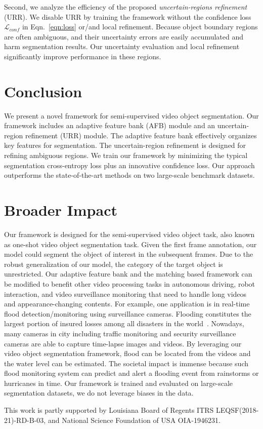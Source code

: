 \documentclass{article}
\begin{document}
Second, we analyze the efficiency of the proposed \emph{uncertain-regions refinement} (URR).
We disable URR by training the framework without the confidence loss $\mathcal{L}_{conf}$ in Eqn.~\ref{eqn:loss} or/and local refinement. 
Because object boundary regions are often ambiguous, and their uncertainty errors are easily accumulated and harm segmentation results. 
Our uncertainty evaluation and local refinement significantly improve performance in these regions. 


\section{Conclusion}

We present a novel framework for semi-supervised video object segmentation. 
Our framework includes an adaptive feature bank (AFB) module and an uncertain-region refinement (URR) module.
The adaptive feature bank effectively organizes key features for segmentation.
The uncertain-region refinement is designed for refining ambiguous regions. 
We train our framework by minimizing the typical segmentation cross-entropy loss plus an innovative confidence loss. 
Our approach outperforms the state-of-the-art methods on two large-scale benchmark datasets.

\newpage

\section*{Broader Impact}

Our framework is designed for the semi-supervised video object task, also known as one-shot video object segmentation task. 
Given the first frame annotation, our model could segment the object of interest in the subsequent frames.
Due to the robust generalization of our model, the category of the target object is unrestricted.
Our adaptive feature bank and the matching based framework can be modified to benefit other video processing tasks in autonomous driving, robot interaction, and video surveillance monitoring that need to handle long videos and appearance-changing contents.
For example, one application is in real-time flood detection/monitoring using surveillance cameras. 
Flooding constitutes the largest portion of insured losses among all disasters in the world~\cite{aerts2014evaluating}.
Nowadays, many cameras in city including traffic monitoring and security surveillance cameras are able to capture time-lapse images and videos.
By leveraging our video object segmentation framework, flood can be located from the videos and the water level can be estimated.
The societal impact is immense because such flood monitoring system can predict and alert a flooding event from rainstorms or hurricanes in time.
Our framework is trained and evaluated on large-scale segmentation datasets, we do not leverage biases in the data.

\begin{ack}
This work is partly supported by Louisiana Board of Regents ITRS LEQSF(2018-21)-RD-B-03, and National Science Foundation of USA OIA-1946231.
\end{ack}



\end{document}
